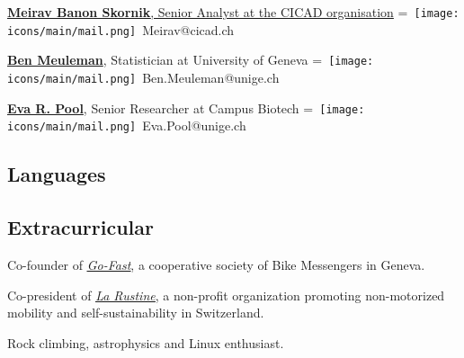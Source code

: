 \documentclass[]{plushcv}
\begin{document}
\begin{minipage}[t]{0.70\textwidth}
\href{https://genev.unige.ch/research/people/Jose-Manuel-De-Abreu-Nunes}{\textbf{Meirav Banon Skornik}, Senior Analyst at the CICAD organisation}
\begingroup
{}=\hbox{
\texttt{[image: icons/main/mail.png]}\hspace{0.1cm} Meirav@cicad.ch
}
\parbox{\wd0}{}\endgroup
\sectionsep

\href{https://www.unige.ch/cisa/center/members/meuleman-ben/}{\textbf{Ben Meuleman}}, Statistician at University of Geneva
\begingroup
{}=\hbox{
\texttt{[image: icons/main/mail.png]}\hspace{0.1cm} Ben.Meuleman@unige.ch
}
\parbox{\wd0}{}\endgroup
\sectionsep



\href{https://www.researchgate.net/profile/Eva-Pool}{\textbf{Eva R. Pool}}, Senior Researcher at Campus Biotech 
\begingroup
{}=\hbox{
\texttt{[image: icons/main/mail.png]}\hspace{0.1cm} Eva.Pool@unige.ch
}
\parbox{\wd0}{}\endgroup
\sectionsep

\end{minipage} 
\hfill
\begin{minipage}[t]{0.25\textwidth} 
\sectionsep
\sectionsep
\sectionsep
\sectionsep
\sectionsep
\sectionsep
\sectionsep
\sectionsep

\subsection{Languages}
\sectionsep
\runsubsection{}


\sectionsep
\runsubsection{}
\sectionsep
\sectionsep
\sectionsep


\subsection{Extracurricular} 
\sectionsep
\sectionsep
\sectionsep
\begin{tightemize}
\item Co-founder of \href{http://www.go-fast.ch/}{\underline{\textit{Go-Fast}}}, a cooperative society of Bike Messengers in Geneva.
\item Co-president of \href{http://www.larustine.bike/}{\underline{\textit{La Rustine}}}, a non-profit organization promoting non-motorized mobility and self-sustainability in Switzerland.
\item Rock climbing, astrophysics and Linux enthusiast.
\end{tightemize}


\end{minipage}
\end{document}
